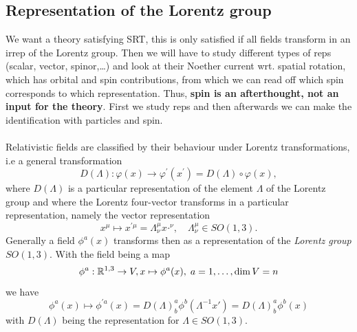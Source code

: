 \subsection{Representation of the Lorentz group}
\label{subsec:repLorentzgroupPhysics}
We want a theory satisfying SRT, this is only satisfied if all fields transform in an irrep of the Lorentz group. Then we will have to study different types of reps (scalar, vector, spinor,\dots) and look at their Noether current wrt. spatial rotation, which has orbital and spin contributions, from which we can read off which spin corresponds to which representation. Thus, \textbf{spin is an afterthought, not an input for the theory}. First we study reps and then afterwards we can make the identification with particles and spin.\\
\\
Relativistic fields are classified by their behaviour under Lorentz transformations, i.e a general transformation
\begin{equation}
	D(\Lambda): \varphi(x) \rightarrow \varphi^\prime (x^\prime) = D(\Lambda) \circ \varphi(x),
\end{equation}
where $D(\Lambda)$ is a particular representation of the element $\Lambda$ of the Lorentz group and where the Lorentz four-vector transforms in a particular representation, namely the vector representation
\begin{equation}
x^{\mu} \mapsto x^{' \mu} = \Lambda^{\mu}_{\nu} x^{¸\nu}, \quad \Lambda^{\mu}_{\nu} \in SO(1,3).
\end{equation}
Generally a field $\phi^a(x)$ transforms then as a representation of the \emph{Lorentz group} $SO(1,3)$. With the field being a map
\begin{equation}
\phi^a :\mathbb{R}^{1,3} \rightarrow V, x\mapsto \phi^a(x), \; a=1,\dots, \dim V=n
\end{equation}
we have
\begin{equation}
\phi^a(x) \mapsto \phi^{'a} (x) = D(\Lambda)^a_b \phi^b (\Lambda^{-1} x') = D(\Lambda)^a_b \phi^b(x)
\end{equation}
with $D(\Lambda)$ being the representation for $\Lambda \in SO(1,3)$.
